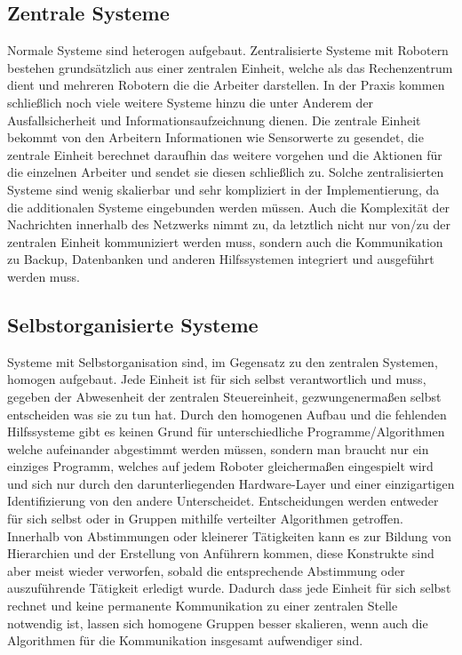 \subsection*{Zentrale Systeme}\label{subsec:ZentraleSysteme}

Normale Systeme sind heterogen aufgebaut.
Zentralisierte Systeme mit Robotern bestehen grundsätzlich aus einer zentralen Einheit, welche als das Rechenzentrum dient und mehreren Robotern die die Arbeiter darstellen.
In der Praxis kommen schließlich noch viele weitere Systeme hinzu die unter Anderem der Ausfallsicherheit und Informationsaufzeichnung dienen.
Die zentrale Einheit bekommt von den Arbeitern Informationen wie Sensorwerte zu gesendet, die zentrale Einheit berechnet daraufhin das weitere vorgehen und die Aktionen für die einzelnen Arbeiter und sendet sie diesen schließlich zu.
Solche zentralisierten Systeme sind wenig skalierbar und sehr kompliziert in der Implementierung, da die additionalen Systeme eingebunden werden müssen.
Auch die Komplexität der Nachrichten innerhalb des Netzwerks nimmt zu, da letztlich nicht nur von/zu der zentralen Einheit kommuniziert werden muss, sondern auch die Kommunikation zu Backup, Datenbanken und anderen Hilfssystemen integriert und ausgeführt werden muss.

\subsection*{Selbstorganisierte Systeme}\label{subsec:SelbstorganisierteSysteme}

Systeme mit Selbstorganisation sind, im Gegensatz zu den zentralen Systemen, homogen aufgebaut.
Jede Einheit ist für sich selbst verantwortlich und muss, gegeben der Abwesenheit der zentralen Steuereinheit, gezwungenermaßen selbst entscheiden was sie zu tun hat.
Durch den homogenen Aufbau und die fehlenden Hilfssysteme gibt es keinen Grund für unterschiedliche Programme/Algorithmen welche aufeinander abgestimmt werden müssen, sondern man braucht nur ein einziges Programm, welches auf jedem Roboter gleichermaßen eingespielt wird und sich nur durch den darunterliegenden Hardware-Layer und einer einzigartigen Identifizierung von den andere Unterscheidet.
Entscheidungen werden entweder für sich selbst oder in Gruppen mithilfe verteilter Algorithmen getroffen.
Innerhalb von Abstimmungen oder kleinerer Tätigkeiten kann es zur Bildung von Hierarchien und der Erstellung von Anführern kommen, diese Konstrukte sind aber meist wieder verworfen, sobald die entsprechende Abstimmung oder auszuführende Tätigkeit erledigt wurde.
Dadurch dass jede Einheit für sich selbst rechnet und keine permanente Kommunikation zu einer zentralen Stelle notwendig ist, lassen sich homogene Gruppen besser skalieren, wenn auch die Algorithmen für die Kommunikation insgesamt aufwendiger sind.

